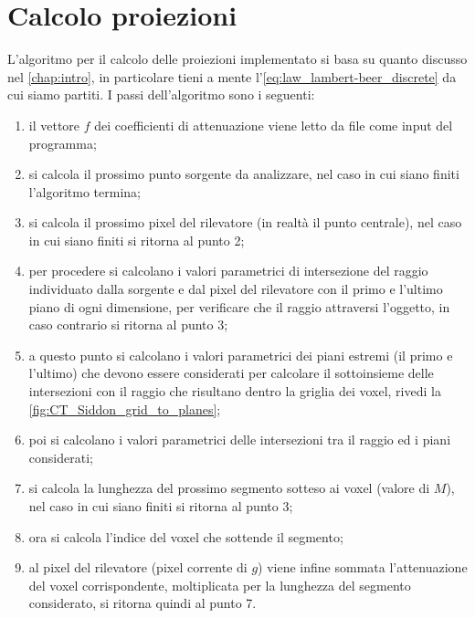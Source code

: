 \documentclass[12pt,a4paper]{report}
\begin{document}
\section{Calcolo proiezioni}

L'algoritmo per il calcolo delle proiezioni implementato si basa su quanto discusso nel \autoref{chap:intro}, in particolare tieni
a mente l'\autoref{eq:law_lambert-beer_discrete} da cui siamo partiti. I passi dell'algoritmo sono i seguenti:
\begin{enumerate}
  \item il vettore \(f\) dei coefficienti di attenuazione viene letto da file come input del programma;
  \item si calcola il prossimo punto sorgente da analizzare, nel caso in cui siano finiti l'algoritmo termina;
  \item si calcola il prossimo pixel del rilevatore (in realtà il punto centrale), nel caso in cui siano finiti si ritorna al
        punto 2;
  \item per procedere si calcolano i valori parametrici di intersezione del raggio individuato dalla sorgente e dal pixel del
        rilevatore con il primo e l'ultimo piano di ogni dimensione, per verificare che il raggio attraversi l'oggetto, in caso
        contrario si ritorna al punto 3;
  \item a questo punto si calcolano i valori parametrici dei piani estremi (il primo e l'ultimo) che devono essere considerati per
        calcolare il sottoinsieme delle intersezioni con il raggio che risultano dentro la griglia dei voxel, rivedi la
        \autoref{fig:CT_Siddon_grid_to_planes};
  \item poi si calcolano i valori parametrici delle intersezioni tra il raggio ed i piani considerati;
  \item si calcola la lunghezza del prossimo segmento sotteso ai voxel (valore di \(M\)), nel caso in cui siano finiti si ritorna
        al punto 3;
  \item ora si calcola l'indice del voxel che sottende il segmento;
  \item al pixel del rilevatore (pixel corrente di \(g\)) viene infine sommata l'attenuazione del voxel corrispondente,
        moltiplicata per la lunghezza del segmento considerato, si ritorna quindi al punto 7.
\end{enumerate}
\end{document}
